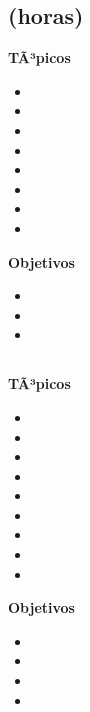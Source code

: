 \subsection{\NCCUATRODef  (\NCCUATROHours horas)}\label{sec:BOK-NC4}

\textbf{TÃ³picos}
\begin{itemize}
	\item \NCCUATROTopicTecnologias
	\item \NCCUATROTopicCaracteristicas
	\item \NCCUATROTopicRol
	\item \NCCUATROTopicNaturaleza
	\item \NCCUATROTopicProtocolos
	\item \NCCUATROTopicHerramientas
	\item \NCCUATROTopicDesarrollo
	\item \NCCUATROTopicPublicacion
\end{itemize}

\textbf{Objetivos}
\begin{itemize}
	\item \NCCUATROObjUNO
	\item \NCCUATROObjDOS
	\item \NCCUATROObjTRES
\end{itemize}

\subsection{\NCCINCODef }\label{sec:BOK-NC5}

\textbf{TÃ³picos}
\begin{itemize}
	\item \NCCINCOTopicProtocolos
	\item \NCCINCOTopicPrincipios
	\item \NCCINCOTopicSitios
	\item \NCCINCOTopicLlamadas
	\item \NCCINCOTopicObjetos
	\item \NCCINCOTopicEl
	\item \NCCINCOTopicHerramientas
	\item \NCCINCOTopicTopicos
	\item \NCCINCOTopicAplicaciones
\end{itemize}

\textbf{Objetivos}
\begin{itemize}
	\item \NCCINCOObjUNO
	\item \NCCINCOObjDOS
	\item \NCCINCOObjTRES
	\item \NCCINCOObjCUATRO
\end{itemize}

